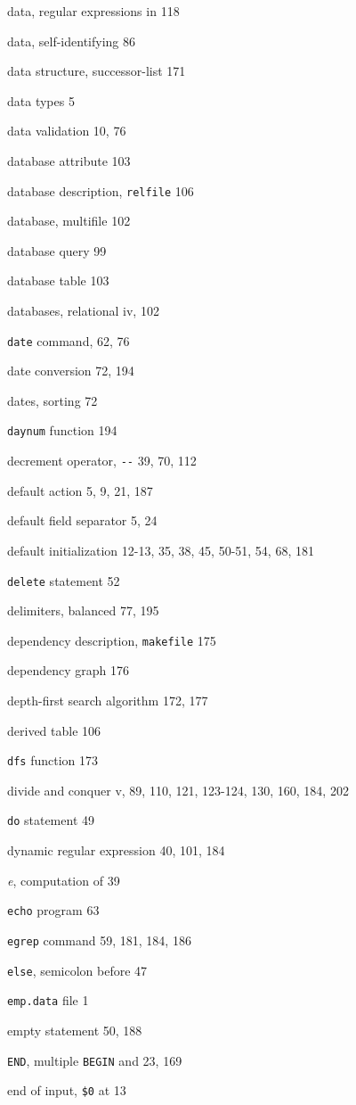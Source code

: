 \begin{multicols}{3}
data, regular expressions in 118

data, self-identifying 86

data structure, successor-list 171

data types 5

data validation 10, 76

database attribute 103

database description, \verb'relfile' 106

database, multifile 102

database query 99

database table 103

databases, relational iv, 102

\verb'date' command, 62, 76

date conversion 72, 194

dates, sorting 72

\verb'daynum' function 194

decrement operator, \verb'--' 39, 70, 112

default action 5, 9, 21, 187

default field separator 5, 24

default initialization 12-13, 35, 38, 45, 50-51, 54, 68, 181

\verb'delete' statement 52

delimiters, balanced 77, 195

dependency description, \verb'makefile' 175

dependency graph 176

depth-first search algorithm 172, 177

derived table 106

\verb'dfs' function 173

divide and conquer v, 89, 110, 121, 123-124, 130, 160, 184, 202

\verb'do' statement 49

dynamic regular expression 40, 101, 184

\textit{e}, computation of 39

\verb'echo' program 63

\verb'egrep' command 59, 181, 184, 186

\verb'else', semicolon before 47

\verb'emp.data' file 1

empty statement 50, 188

\verb'END', multiple \verb'BEGIN' and 23, 169

end of input, \verb'$0' at 13


\end{multicols}
